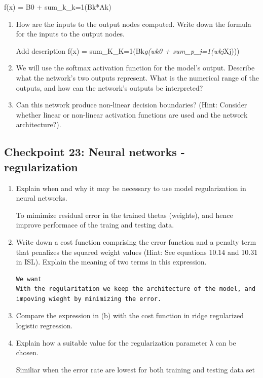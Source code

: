 \documentclass[
  letterpaper,
  DIV=11,
  numbers=noendperiod]{scrartcl}
\begin{document}
f(x) = B0 + sum\_k\_k=1(Bk*Ak)

\begin{enumerate}
\def\labelenumi{(\alph{enumi})}
\setcounter{enumi}{7}
\item
  How are the inputs to the output nodes computed. Write down the
  formula for the inputs to the output nodes.

  Add description f(x) = sum\_K\_K=1(Bk\emph{g(wk0 +
  sum\_p\_j=1(wkj}Xj)))
\item
  We will use the softmax activation function for the model's output.
  Describe what the network's two outputs represent. What is the
  numerical range of the outputs, and how can the network's outputs be
  interpreted?
\item
  Can this network produce non-linear decision boundaries? (Hint:
  Consider whether linear or non-linear activation functions are used
  and the network architecture?).
\end{enumerate}

\hypertarget{checkpoint-23-neural-networks---regularization}{%
\subsection{Checkpoint 23: Neural networks -
regularization}\label{checkpoint-23-neural-networks---regularization}}

\begin{enumerate}
\def\labelenumi{(\alph{enumi})}
\item
  Explain when and why it may be necessary to use model regularization
  in neural networks.

  To mimimize residual error in the trained thetas (weights), and hence
  improve performace of the traing and testing data.
\item
  Write down a cost function comprising the error function and a penalty
  term that penalizes the squared weight values (Hint: See equations
  10.14 and 10.31 in ISL). Explain the meaning of two terms in this
  expression.

\begin{verbatim}
We want
With the regularitation we keep the architecture of the model, and impoving wieght by minimizing the error.
\end{verbatim}
\item
  Compare the expression in (b) with the cost function in ridge
  regularized logistic regression.
\item
  Explain how a suitable value for the regularization parameter λ can be
  chosen.

  Similiar when the error rate are lowest for both training and testing
  data set
\end{enumerate}
\end{document}
